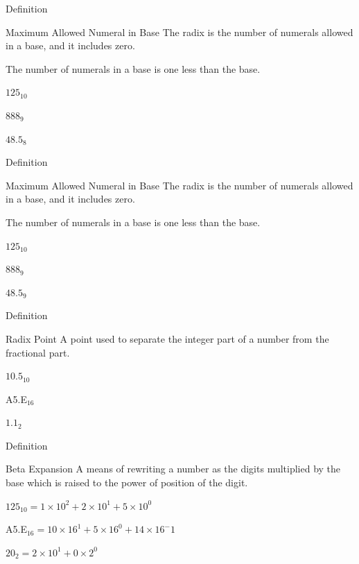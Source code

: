 \documentclass{beamer}
\begin{document}
\begin{frame}{Definition}
  \begin{block}{Maximum Allowed Numeral in Base}
    The radix is the number of numerals allowed in a base, and it includes zero. \pause

    The number of numerals in a base is one less than the base.
  \end{block}\pause

  \begin{example}
    $125_{10}$ \pause

    $888_9$ \pause

    $48.5_8$ \pause
  \end{example}
\end{frame}
\begin{frame}{Definition}
  \begin{block}{Maximum Allowed Numeral in Base}
    The radix is the number of numerals allowed in a base, and it includes zero. \pause

    The number of numerals in a base is one less than the base.
  \end{block} \pause

  \begin{example}
    $125_{10}$

    $888_9$

    $48.5_9$
  \end{example}
\end{frame}

\begin{frame}{Definition}
  \begin{block}{Radix Point}
    A point used to separate the integer part of a number from the fractional part.
  \end{block}\pause

  \begin{example}
      $10.5_{10}$

      A5.E$_{16}$

      $1.1_2$
  \end{example}
\end{frame}

\begin{frame}{Definition}
  \begin{block}{Beta Expansion}
    A means of rewriting a number as the digits multiplied by the base which is raised to the power of position of the digit.
  \end{block}\pause

  \begin{example}
    $125_{10} = 1\times10^2 + 2\times10^1 + 5\times10^0$ \pause

    A5.E$_{16} = 10\times16^1 + 5\times16^0 + 14\times16^-1$ \pause

    $20_2 = 2\times10^1+0\times2^0$
  \end{example}
\end{frame}
\end{document}
